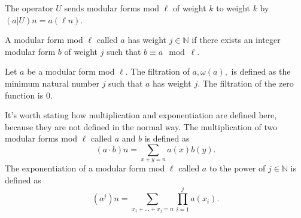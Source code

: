 \begin{definition} [U Operator]
  \label{def:UOp}

  The operator $U$ sends modular forms mod $\ell$ of weight $k$ to weight $k$ by \\
  $ (a|U) n = a(\ell n).$
\end{definition}

\begin{definition} [hasWeight]
  \label{def:hasWeight}
  \leanok
  A modular form mod $\ell$ called $a$ has weight $j \in \mathbb{N}$ if
  there exists an integer modular form $b$ of weight $j$ such that $b \equiv a \mod \ell$.
\end{definition}

\begin{definition} [Filtration]
  \label{def:Filtration}
  \leanok
  Let $a$ be a modular form mod $\ell$. The filtration of $a, \omega (a), $ 
  is defined as the minimum natural number $j$ such that $a$ has weight $j$. 
  The filtration of the zero function is $0$.
\end{definition}

\begin{definition} 
  \label{def:mulpow}
  \leanok
  It's worth stating how multiplication and exponentiation are defined here, because they are not defined in the normal way.
  The multiplication of two modular forms mod $\ell$ called $a$ and $b$ is defined as 
  \[(a \cdot b) n = \sum_{x + y = n} a(x) b(y).\] 
  The exponentiation of a modular form mod $\ell$ called $a$ to the power of $j \in \mathbb{N}$ is defined as 
  \[(a^j) n = \sum_ {x_1 + ... + x_j = n} \prod_{i = 1}^j a (x_i).\]
\end{definition}



